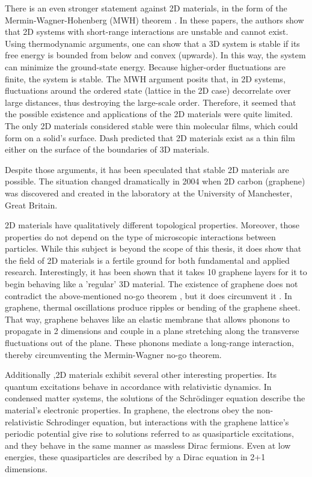 There is an even stronger statement against 2D materials, in the form of the Mermin-Wagner-Hohenberg (MWH) theorem \cite{Hohenberg}\cite{Mermin2}. In these papers, the authors show that 2D systems with short-range interactions are unstable and cannot exist. Using thermodynamic arguments, one can show that a 3D system is stable if its free energy is bounded from below and convex (upwards). In this way, the system can minimize the ground-state energy. Because higher-order fluctuations are finite, the system is stable.
The MWH argument posits that, in 2D systems, fluctuations around the ordered state (lattice in the 2D case) decorrelate over large distances, thus destroying the large-scale order. 
Therefore, it seemed that the possible existence and applications of the 2D materials were quite limited. The only 2D materials considered stable were thin molecular films, which could form on a solid's surface. Dash\cite{2DMatter1} predicted that 2D materials exist as a thin film either on the surface of the boundaries of 3D materials.

Despite those arguments, it has been speculated that stable 2D materials are possible\cite{2DMatter1}. The situation changed dramatically in 2004 when 2D carbon (graphene) was discovered and created in the laboratory\cite{Graphene0, GrapheneN} at the University of Manchester, Great Britain. 

2D materials have qualitatively different topological properties\cite{2DMatterCurvature}. Moreover, those properties do not depend on the type of microscopic interactions between particles. While this subject is beyond the scope of this thesis, it does show that the field of 2D materials is a fertile ground for both fundamental and applied research. Interestingly, it has been shown \cite{GraphLayers} that it takes 10 graphene layers for it to begin behaving like a 'regular' 3D material.  
The existence of graphene does not contradict the above-mentioned no-go theorem \cite{Mermin2}, but it does circumvent it \cite{GrapheneRiples}. In graphene, thermal oscillations produce ripples or bending of the graphene sheet. That way, graphene behaves like an elastic membrane that allows phonons to propagate in 2 dimensions and couple in a plane stretching along the transverse fluctuations out of the plane. These phonons mediate a long-range interaction, thereby circumventing the Mermin-Wagner no-go theorem. 

Additionally \cite{Graphene0} \cite{Dirac2}\cite{Dirac3},2D materials exhibit several other interesting properties. Its quantum excitations behave in accordance with relativistic dynamics. In condensed matter systems, the solutions of the Schrödinger equation describe the material's electronic properties. In graphene, the electrons obey the non-relativistic Schrodinger equation, but interactions with the graphene lattice's periodic potential give rise to solutions referred to as quasiparticle excitations, and they behave in the same manner as massless Dirac fermions. Even at low energies, these quasiparticles are described by a Dirac equation in 2+1 dimensions.  

